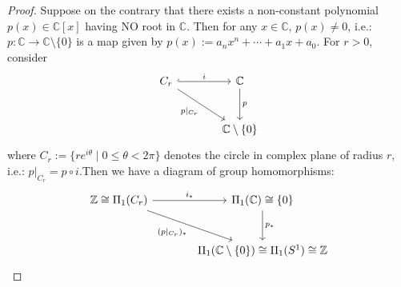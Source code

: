 \begin{proof}
    Suppose on the contrary that there exists a non-constant polynomial $p(x) \in \mathbb{C}[x]$ having NO root in $\mathbb{C}$. Then for any $x \in \mathbb{C}$, $p(x) \neq 0$, i.e.: $p: \mathbb{C} \to \mathbb{C} \setminus \{0\}$ is a map given by $p(x) := a_n x^n + \cdots + a_1 x + a_0$. For $r>0$, consider
    \begin{equation*}
    \begin{tikzcd}[row sep=large, column sep=large]
        C_r \arrow[r, hook, "i"] \arrow[dr, "p|_{C_r}"'] & \mathbb{C} \arrow[d, "p"] \\
        & \mathbb{C} \setminus \{0\}
    \end{tikzcd}
    \end{equation*}
    where $C_r:= \{ re^{i\theta} \mid 0 \leq \theta <2\pi\}$ denotes the circle in complex plane of radius $r$, i.e.: $\left. p \right|_{C_r} = p \circ i$.Then we have a diagram of group homomorphisms: 
    \begin{equation*}
    \begin{tikzcd}[column sep=large, row sep=large]
    \mathbb{Z} \cong \Pi_1(C_r) \arrow[r, "i_*"] \arrow[dr, "(p|_{C_r})_*"'] & \Pi_1(\mathbb{C}) \cong \{0\} \arrow[d, "p_*"] \\
    & \Pi_1(\mathbb{C}\setminus\{0\}) \cong \Pi_1(S^1) \cong \mathbb{Z}
    \end{tikzcd}
    \end{equation*}


\end{proof}
